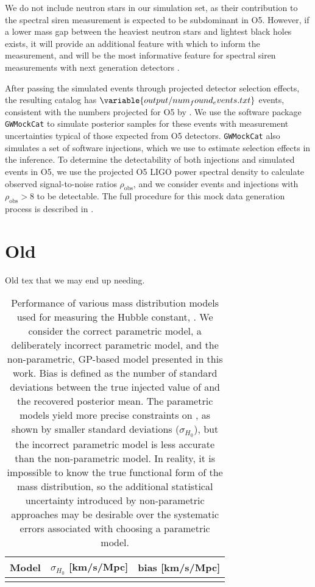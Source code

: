 \documentclass[]{aastex631}
\begin{document}
We do not include neutron stars in our simulation set, as their contribution to the spectral siren measurement is expected to be subdominant in \ac{O5}.
However, if a lower mass gap between the heaviest neutron stars and lightest black holes exists, it will provide an additional feature with which to inform the measurement, and will be the most informative feature for spectral siren measurements with next generation detectors \citep{ezquiaga_spectral_2022}.

After passing the simulated events through projected detector selection effects, the resulting catalog has $\variable{output/num_found_events.txt}$ events, consistent with the numbers projected for \ac{O5} by \citet{kiendrebeogo_updated_2023}.
We use the software package \texttt{GWMockCat} \citep{farah_things_2023} to simulate posterior samples for these events with measurement uncertainties typical of those expected from \ac{O5} detectors.
\texttt{GWMockCat} also simulates a set of software injections, which we use to estimate selection effects in the inference.
To determine the detectability of both injections and simulated events in O5, we use the projected \ac{O5} LIGO power spectral density \citep{obsscen_noise_curves,abbott_prospects_2020} to calculate observed signal-to-noise ratios $\rho_{\text{obs}}$, and we consider events and injections with $\rho_{\text{obs}}>8$ to be detectable. 
The full procedure for this mock data generation process is described in \citet{fishbach_where_2017, farah_things_2023, essick_ensuring_2024}.

\section{Old}
Old tex that we may end up needing.

\begin{table}[]
    \centering
    \begin{tabular}{c|c c}
         Model & $\sigma_{H_0}$ [km/s/Mpc] & bias [km/s/Mpc]\\
         \hline
         & 
    \end{tabular}
    \caption{Performance of various mass distribution models used for measuring the Hubble constant, \Ho.
    We consider the correct parametric model, a deliberately incorrect parametric model, and the non-parametric, \ac{GP}-based model presented in this work.
    Bias is defined as the number of standard deviations between the true injected value of \Ho and the recovered posterior mean. 
    The parametric models yield more precise constraints on \Ho{}, as shown by smaller standard deviations ($\sigma_{H_0}$), but the incorrect parametric model is less accurate than the non-parametric model.
    In reality, it is impossible to know the true functional form of the mass distribution, so the additional statistical uncertainty introduced by non-parametric approaches may be desirable over the systematic errors associated with choosing a parametric model.
    }
    \label{tab:bias}
\end{table}
\end{document}
